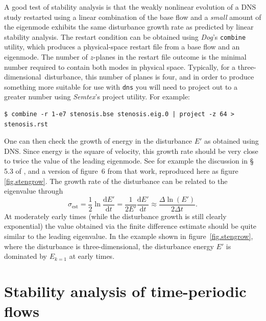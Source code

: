 \documentclass[11pt,a4paper]{report}
\newcommand\cd{\mathrm{d}}
\newcommand\threed{three-di\-men\-sion\-al}
\newcommand{\Semtex}{\emph{Semtex}}
\newcommand{\Dog}{\emph{Dog}}
\begin{document}
A good test of stability analysis is that the weakly nonlinear
evolution of a DNS study restarted using a linear combination of the
base flow and a \emph{small} amount of the eigenmode exhibits the same
disturbance growth rate as predicted by linear stability analysis.  The
restart condition can be obtained using \Dog's \verb|combine| utility,
which produces a physical-space restart file from a base flow and an
eigenmode.  The number of $z$-planes in the restart file outcome is
the minimal number required to contain both modes in physical space.
Typically, for a \threed\ disturbance, this number of planes is four,
and in order to produce something more suitable for use with
\verb|dns| you will need to project out to a greater number using
\Semtex's project utility.  For example:
\begin{verbatim}
$ combine -r 1-e7 stenosis.bse stenosis.eig.0 | project -z 64 > stenosis.rst
\end{verbatim}

One can then check the growth of energy in the disturbance $E'$ as
obtained using DNS.  Since energy is the square of velocity, this
growth rate should be very close to twice the value of the leading
eigenmode.  See for example the discussion in \S\,5.3 of
\citet{shbl05}, and a version of figure~6 from that work, reproduced
here as figure\,\ref{fig.stengrow}.  The growth rate of the
disturbance can be related to the eigenvalue through 
\begin{equation}
  \sigma_\text{est}  = \frac{1}{2}\ln\frac{\cd E'}{\cd t} = \frac{1}{2E'}\frac{\cd E'}{\cd t} \approx \frac{\Delta \ln(E')}{2\Delta t}.
\end{equation}
At moderately early times (while the disturbance growth is still
clearly exponential) the value obtained via the finite difference
estimate should be quite similar to the leading eigenvalue.  In the
example shown in figure~\ref{fig.stengrow}, where the disturbance is
\threed, the disturbance energy $E'$ is dominated by $E_{k=1}$ at
early times.



\chapter{Stability analysis of time-periodic flows}
\label{ch.floquet}
\end{document}
